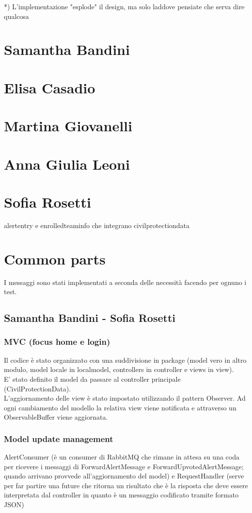\documentclass[a4paper,12pt]{report}
\begin{document}
*) L'implementazione "esplode" il design, ma solo laddove pensiate che serva dire qualcosa

\section{Samantha Bandini}
\section{Elisa Casadio}
\section{Martina Giovanelli}
\section{Anna Giulia Leoni}
\section{Sofia Rosetti}
alertentry e enrolledteaminfo che integrano civilprotectiondata

\section{Common parts}
I messaggi sono stati implementati a seconda delle necessità facendo per ognuno i test.

\subsection{Samantha Bandini - Sofia Rosetti}

\subsubsection{MVC (focus home e login)}
Il codice è stato organizzato con una suddivisione in package (model vero in altro modulo, model locale in localmodel, controllers in controller e views in view).\\
E' stato definito il model da passare al controller principale (CivilProtectionData).\\
L'aggiornamento delle view è stato impostato utilizzando il pattern Observer. Ad ogni cambiamento del modello la relativa view viene notificata e attraverso un ObservableBuffer viene aggiornata.\\


\subsubsection{Model update management}
AlertConsumer (è un consumer di RabbitMQ che rimane in attesa su una coda per ricevere i messaggi di ForwardAlertMessage e ForwardUpvotedAlertMessage; quando arrivano provvede all'aggiornamento del model) e RequestHandler (serve per far partire una future che ritorna un risultato che è la risposta che deve essere interpretata dal controller in quanto è un messaggio codificato tramite formato JSON)
\end{document}
